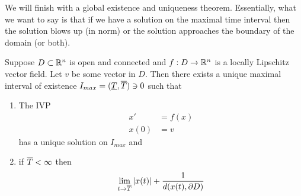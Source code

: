 We will finish with a global existence and uniqueness theorem. Essentially, what we want to say is that if we have a solution on the maximal time interval then the solution blows up (in norm) or the solution approaches the boundary of the domain (or both).
\begin{theorem}
Suppose $D \subset \mathbb{R}^n$ is open and connected and $f: D \to \mathbb{R}^n$ is a locally Lipschitz vector field. Let $v$ be some vector in $D$. Then there exists a unique maximal interval of existence $I_{max} = (\underline{T}, \overline{T}) \ni 0$ such that
\begin{enumerate}
    \item The IVP
    \begin{align*}
        x' &= f(x)\\
        x(0) &= v
    \end{align*}
    has a unique solution on $I_{max}$ and
    \item if $\overline{T} < \infty$ then
    $$ \lim_{t \to \overline{T}} |x(t)| + \frac{1}{d(x(t), \partial D)} $$
\end{enumerate}
\end{theorem}
